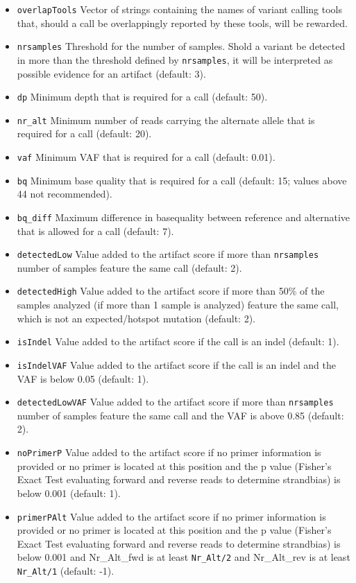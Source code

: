 \documentclass{article}
\begin{document}
\begin{itemize}
  \item \texttt{overlapTools} Vector of strings containing the names of variant calling tools that, should a call be overlappingly reported by these tools, will be rewarded.
  \item \texttt{nrsamples} Threshold for the number of samples. Shold a variant be detected in more than the threshold defined by \texttt{nrsamples}, it will be interpreted as possible evidence for an artifact (default: 3).
  \item \texttt{dp} Minimum depth that is required for a call (default: 50).
  \item \texttt{nr\_alt} Minimum number of reads carrying the alternate allele that is required for a call (default: 20).
  \item \texttt{vaf} Minimum VAF that is required for a call (default: 0.01).
  \item \texttt{bq} Minimum base quality that is required for a call (default: 15; values above 44 not recommended).
  \item \texttt{bq\_diff} Maximum difference in basequality between reference and alternative that is allowed for a call (default: 7).
  \item \texttt{detectedLow} Value added to the artifact score if more than \texttt{nrsamples} number of samples feature the same call (default: 2).
  \item \texttt{detectedHigh} Value added to the artifact score if more than 50\% of the samples analyzed (if more than 1 sample is analyzed) feature the same call, which is not an expected/hotspot mutation (default: 2).
  \item \texttt{isIndel} Value added to the artifact score if the call is an indel (default: 1).
  \item \texttt{isIndelVAF} Value added to the artifact score if the call is an indel and the VAF is below 0.05 (default: 1).
  \item \texttt{detectedLowVAF} Value added to the artifact score if more than \texttt{nrsamples} number of samples feature the same call and the VAF is above 0.85 (default: 2).
  \item \texttt{noPrimerP} Value added to the artifact score if no primer information is provided or no primer is located at this position and the p value (Fisher's Exact Test evaluating forward and reverse reads to determine strandbias) is below 0.001 (default: 1).
  \item \texttt{primerPAlt} Value added to the artifact score if no primer information is provided or no primer is located at this position and the p value (Fisher's Exact Test evaluating forward and reverse reads to determine strandbias) is below 0.001 and Nr\_Alt\_fwd is at least \texttt{Nr\_Alt/2} and Nr\_Alt\_rev is at least \texttt{Nr\_Alt/1} (default: -1).

\end{itemize}
\end{document}
